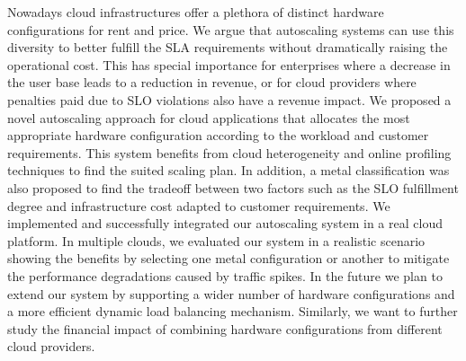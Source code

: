 
Nowadays cloud infrastructures offer a plethora of distinct hardware configurations for rent and price. We argue that autoscaling systems can use this diversity to better fulfill the SLA requirements without dramatically raising the operational cost. This has special importance for enterprises where a decrease in the user base leads to a reduction in revenue, or for cloud providers where penalties paid due to SLO violations also have a revenue impact. We proposed a novel autoscaling approach for cloud applications that allocates the most appropriate hardware configuration according to the workload and customer requirements. This system benefits from cloud heterogeneity and online profiling techniques to find the suited scaling plan. In addition, a metal classification was also proposed to find the tradeoff between two factors such as the SLO fulfillment degree and infrastructure cost adapted to customer requirements. We implemented and successfully integrated our autoscaling system in a real cloud platform. In multiple clouds, we evaluated our system in a realistic scenario showing the benefits by selecting one metal configuration or another to mitigate the performance degradations caused by traffic spikes. 
In the future we plan to extend our system by supporting a wider number of hardware configurations and a more efficient dynamic load balancing mechanism. Similarly, we want to further study the financial impact of combining hardware configurations from different cloud providers.









